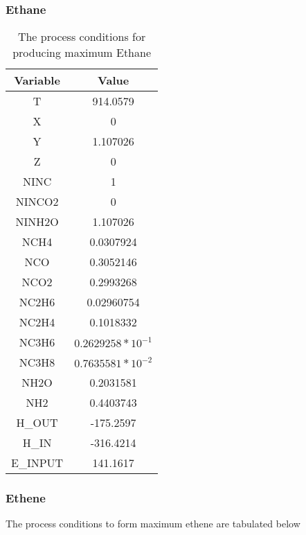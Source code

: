 \documentclass[journal=iecred,manuscript=article]{achemso}
\begin{document}
\subsubsection{Ethane}
\FloatBarrier
\begin{table}[H]
\caption{The process conditions for producing maximum Ethane} 
\centering
\begin{tabular}{|c|c|}
\hline\hline %
Variable & Value \\ 
[1ex] %
\hline %
T	& 914.0579 \\
\hline
X	 & 0 \\
\hline
Y	& 1.107026 \\
\hline
Z	&  0 \\
\hline
NINC	& 1 \\
\hline
NINCO2	& 0 \\
\hline
NINH2O	&  1.107026 \\
\hline
NCH4 &	 0.0307924 \\
\hline
NCO	&  0.3052146  \\
\hline
NCO2	& 0.2993268 \\
\hline
NC2H6	& 0.02960754 \\
\hline
NC2H4	&  0.1018332 \\
\hline
NC3H6	& $0.2629258*10^{-1}$ \\
\hline
NC3H8	& $0.7635581*10^{-2}$ \\
\hline
NH2O	& 0.2031581 \\
\hline
NH2 &  0.4403743 \\
\hline
H_{OUT}	& -175.2597   \\
\hline
H_{IN}	& -316.4214  \\
\hline
E_{INPUT}	& 141.1617  \\
\hline 
\end{tabular}
\end{table}
\FloatBarrier


\newpage
\subsubsection{Ethene}
The process conditions to form maximum ethene are tabulated below 
\end{document}
